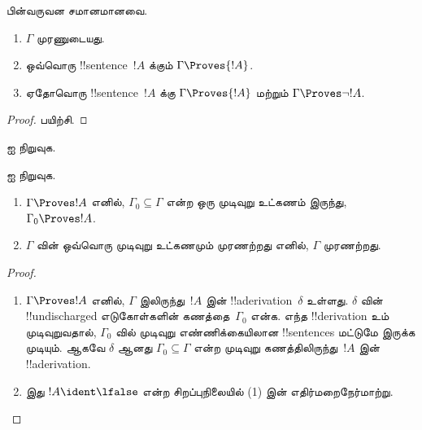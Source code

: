\documentclass[../../../include/open-logic-section]{subfiles}
\begin{document}
\begin{prop}
பின்வருவன சமானமானவை.
    \begin{enumerate}
      \item \( \Gamma \) முரணுடையது.
      \item ஒவ்வொரு !!{sentence}~\( {!A} \) க்கும் \( \Gamma \Proves {!A} \).
      \item ஏதோவொரு !!{sentence}~\( {!A} \) க்கு \( \Gamma \Proves {!A} \)
        மற்றும் \( \Gamma \Proves \lnot {!A} \).
    \end{enumerate}
\end{prop}

\begin{proof}
பயிற்சி.
\end{proof}

\begin{prob}
 ஐ நிறுவுக.
\end{prob}
\tagendprob

\begin{prob}
 ஐ நிறுவுக.
\end{prob}
\tagendprob

\begin{prop}[இறுக்கத்தன்மை]
  \begin{enumerate}
  \item $\Gamma \Proves !A$ எனில், $\Gamma_0 \subseteq \Gamma$ என்ற ஒரு
    முடிவுறு உட்கணம் இருந்து, $\Gamma_0 \Proves !A$.
  \item $\Gamma$ வின் ஒவ்வொரு முடிவுறு உட்கணமும் முரணற்றது எனில்,
    $\Gamma$ முரணற்றது.
  \end{enumerate}
\end{prop}

\begin{proof}
  \begin{enumerate}
    \item $\Gamma \Proves !A$ எனில், $\Gamma$ இலிருந்து~$!A$ இன்
      !!a{derivation}~$\delta$ உள்ளது. $\delta$ வின் !!{undischarged}
      எடுகோள்களின் கணத்தை~$\Gamma_0$ என்க. எந்த !!{derivation} உம்
      முடிவுறுவதால், $\Gamma_0$ வில் முடிவுறு எண்ணிக்கையிலான
      !!{sentence}s மட்டுமே இருக்க முடியும். ஆகவே $\delta$ ஆனது
      $\Gamma_0 \subseteq \Gamma$ என்ற முடிவுறு கணத்திலிருந்து~$!A$ இன்
      !!a{derivation}.
    \item இது $!A \ident \lfalse$ என்ற சிறப்புநிலையில் (1) இன்
      எதிர்மறைநேர்மாற்று.
  \end{enumerate}
\end{proof}
\end{document}
